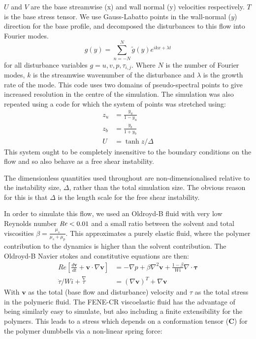 \documentclass{jfm}
\newcommand{\dt}[1]{\frac{d #1}{d t}} %
\newcommand\Rey{\mbox{\textit{Re}}}  %
\begin{document}
$U$ and $V$ are the base streamwise (x) and wall normal (y) velocities respectively. $T$ is the base stress tensor. We use Gauss-Labatto points in the wall-normal ($y$) direction for the base profile, and decomposed the disturbances to this flow into Fourier modes.
\begin{equation}
    g(y) = \sum\limits_{n=-N}^{N} \widetilde{g}(y) e^{ikx + \lambda t}
\end{equation}
for all disturbance variables $g = u, v, p, \tau_{i,j}$. Where $N$ is the number of Fourier modes, $k$ is the streamwise wavenumber of the disturbance and $\lambda$ is the growth rate of the mode. This code uses two domains of pseudo-spectral points to give increased resolution in the centre of the simulation. The simulation was also repeated using a code for which the system of points was stretched using:
\begin{align}
    z_{u} &= \frac{y_{u}}{1-y_{u}} \\
    z_{b} &= \frac{y_{b}}{1+y_{b}} \\
    U     &= \tanh{z/\Delta} 
    \label{eq:KH_inf_profile}
\end{align}
This system ought to be completely insensitive to the boundary conditions on the flow and so also behave as a free shear instability. 

The dimensionless quantities used throughout are non-dimensionalised relative to the instability size, $\Delta$, rather than the total simulation size. The obvious reason for this is that $\Delta$ is the length scale for the free shear instability.

In order to simulate this flow, we used an Oldroyd-B fluid with very low Reynolds number $\Rey < 0.01$ and a small ratio between the solvent and total viscosities $\beta = \frac{\mu_{s}}{\mu_{s}+\mu_{p}}$. This approximates a purely elastic fluid, where the polymer contribution to the dynamics is higher than the solvent contribution. The Oldroyd-B Navier stokes and constitutive equations are then:
\begin{align}
    Re \left[ \dt{\mathbf{v}} + \mathbf{v} \cdot \nabla  \mathbf{v} \right] &= - \nabla p + \beta \nabla^{2} \mathbf{v} + \frac{1-\beta}{Wi} \nabla \cdot \mathbf{\tau} \\
    \dot{\tau}/Wi + \overset{\nabla}\tau &= \left(\nabla \mathbf{v}\right)^{T} + \nabla{\mathbf{v}}
\end{align}
With $\mathbf{v}$ as the total (base flow and disturbance) velocity and $\tau$ as the total stress in the polymeric fluid. The FENE-CR viscoelastic fluid has the advantage of being similarly easy to simulate, but also including a finite extensibility for the polymers. This leads to a stress which depends on a conformation tensor ($\mathbf{C}$) for the polymer dumbbells via a non-linear spring force:
\end{document}
